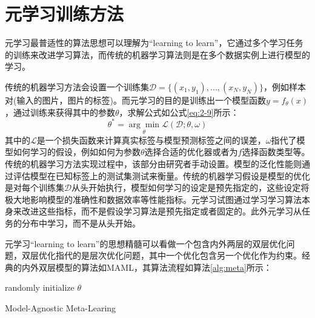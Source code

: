 \section{元学习训练方法}
元学习最普适性的算法思想可以理解为“learning to learn”，它通过多个学习任务的训练来改进学习算法，而传统的机器学习算法则是在多个数据实例上进行模型的学习。

传统的机器学习方法会设置一个训练集\(\mathcal{D} = \{(x_{1},y_{1}),...,(x_{N},y_{N})\}\)，例如样本对(输入的图片，图片的标签)。而元学习的目的是训练出一个模型函数\(y = f_{\theta}(x)\)，通过训练来获得其中的参数\(\theta\)，求解公式如公式\ref{eq:2-9}所示：
\begin{equation}
  \theta^{*} = \underset { \theta } { \operatorname { arg } \operatorname { min } }\mathcal{L}(\mathcal{D};\theta,\omega) \label{eq:2-9}
\end{equation}
其中的\(\mathcal{L}\)是一个损失函数来计算真实标签与模型预测标签之间的误差，\(\omega\)指代了模型如何学习的假设，例如如何为参数\(\theta\)选择合适的优化器或者为\(f\)选择函数类型等。传统的机器学习方法实现过程中，该部分由研究者手动设置。模型的泛化性能则通过评估模型在已知标签上的测试集测试来衡量。传统的机器学习假设是模型的优化是对每个训练集\(\mathcal{D}\)从头开始执行，模型如何学习的设定是预先指定的，这些设定将极大地影响模型的准确性和数据效率等性能指标。元学习试图通过学习学习算法本身来改进这些指标，而不是假设学习算法是预先指定或者固定的。此外元学习从任务的分布中学习，而不是从头开始。

元学习“learning to learn”的思想精髓可以看做一个包含内外两层的双层优化问题，双层优化\cite{stackelberg1952theory}指代的是层次优化问题，其中一个优化包含另一个优化作为约束\cite{franceschi2018bilevel}\cite{sinha2017review}。经典的内外双层模型的算法如MAML，其算法流程如算法\ref{alg:meta}所示：
\begin{algorithm}
    randomly initialize \(\theta\) \\
  \caption{Model-Agnostic Meta-Learing}\label{alg:meta}
  \end{algorithm}

